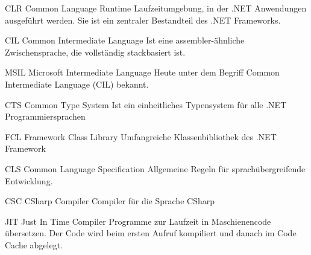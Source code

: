 {CLR}
{Common Language Runtime}
{
	Laufzeitumgebung, in der .NET Anwendungen ausgeführt werden. Sie ist ein zentraler Bestandteil des .NET Frameworks. 
}

{CIL}
{Common Intermediate Language}
{
	Ist eine assembler-ähnliche Zwischensprache, die vollständig stackbasiert ist.
}

{MSIL}
{Microsoft Intermediate Language}
{
	Heute unter dem Begriff Common Intermediate Language (CIL) bekannt.
}

{CTS}
{Common Type System}
{
	Ist ein einheitliches Typensystem für alle .NET Programmiersprachen
}

{FCL}
{Framework Class Library}
{
	Umfangreiche Klassenbibliothek des .NET Framework
}


{CLS}
{Common Language Specification}
{
	Allgemeine Regeln für sprachübergreifende Entwicklung.
}

{CSC}
{CSharp Compiler}
{
	Compiler für die Sprache CSharp
}

{JIT}
{Just In Time Compiler}
{
	Programme zur Laufzeit in Maschienencode übersetzen. Der Code wird beim ersten Aufruf kompiliert und danach im Code Cache abgelegt. 
}